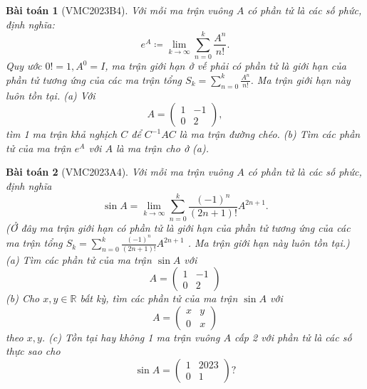 \documentclass{article}
\newtheorem{baitoan}{Bài toán}
\begin{document}
\begin{baitoan}[VMC2023B4]
	Với mỗi ma trận vuông $A$ có phần tử là các số phức, định nghĩa:
	\begin{equation*}
		e^A\coloneqq\lim_{k\to\infty} \sum_{n=0}^k \frac{A^n}{n!}.
	\end{equation*}
	Quy ước $0! = 1,A^0 = I$, ma trận giới hạn ở vế phải có phần tử là giới hạn của phần tử tương ứng của các ma trận tổng $S_k = \sum_{n=0}^k \frac{A^n}{n!}$. Ma trận giới hạn này luôn tồn tại. (a) Với
	\begin{equation*}
		A = \begin{pmatrix}
			1 & -1\\0 & 2
		\end{pmatrix},
	\end{equation*}
	tìm 1 ma trận khả nghịch $C$ để $C^{-1}AC$ là ma trận đường chéo. (b) Tìm các phần tử của ma trận $e^A$ với $A$ là ma trận cho ở (a).
\end{baitoan}

\begin{baitoan}[VMC2023A4]
	Với mỗi ma trận vuông $A$ có phần tử là các số phức, định nghĩa
	\begin{equation}
		\sin A = \lim_{k\to\infty} \sum_{n=0}^k \frac{(-1)^n}{(2n + 1)!}A^{2n + 1}.
	\end{equation}
	(Ở đây ma trận giới hạn có phần tử là giới hạn của phần tử tương ứng của các ma trận tổng $S_k = \sum_{n=0}^k \frac{(-1)^n}{(2n + 1)!}A^{2n + 1}$ . Ma trận giới hạn này luôn tồn tại.) (a) Tìm các phần tử của ma trận $\sin A$ với
	\begin{equation}
		A = \begin{pmatrix}
			1 & -1\\0 & 2
		\end{pmatrix}
	\end{equation}
	(b) Cho $x,y\in\mathbb{R}$ bất kỳ, tìm các phần tử của ma trận $\sin A$ với
	\begin{equation}
		A = \begin{pmatrix}
			x & y\\0 & x
		\end{pmatrix}
	\end{equation}
	theo $x,y$. (c) Tồn tại hay không 1 ma trận vuông $A$ cấp 2 với phần tử là các số thực sao cho
	\begin{equation}
		\sin A = \begin{pmatrix}
			1 & 2023\\0 & 1
		\end{pmatrix}?
	\end{equation}
\end{baitoan}
\end{document}

